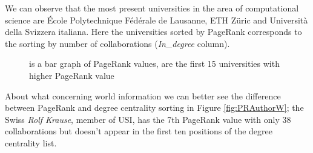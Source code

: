 \documentclass[]{usiinfbachelorproject}
\begin{document}
We can observe that the most present universities in the area of computational science are \'{E}cole Polytechnique F\'{e}d\'{e}rale de Lausanne, ETH Z\"{u}ric and Universit\`{a} della Svizzera italiana. Here the universities sorted by PageRank corresponds to the  sorting by number of collaborations (\textit{In\_degree} column).
\begin{figure}[tb]
	\centering
	\caption{  is a bar graph of PageRank values,  are the first 15 universities with higher PageRank value}
	\label{fig:PRUniversities}
\end{figure}

About what concerning world information we can better see the difference between PageRank and degree centrality sorting in Figure \ref{fig:PRAuthorW}; the Swiss  \textit{Rolf Krause}, member of USI, has the 7th PageRank value with only 38 collaborations but doesn't appear in the first ten positions of the degree centrality list.
\end{document}
